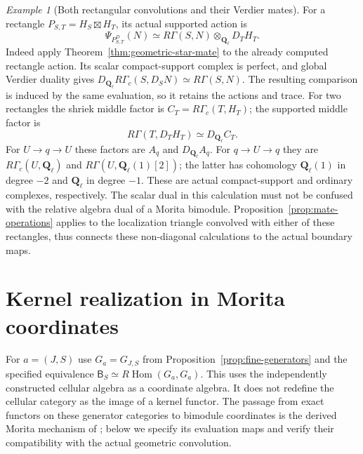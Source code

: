 \documentclass[11pt]{article}
\theoremstyle{definition}
\theoremstyle{remark}
\newtheorem{example}[proposition]{Example}
\newcommand{\Q}{\mathbf Q_\ell}
\newcommand{\RHom}{R\operatorname{Hom}}
\begin{document}
\begin{example}[Both rectangular convolutions and their Verdier mates]
\label{ex:rectangles-with-duals}
For a rectangle $P_{S,T}=H_S\boxtimes H_T$, its actual supported action is
\[
 \Psi_{P_{S,T}^D}(N)\simeq R\Gamma(S,N)\otimes_{\Q}D_TH_T.
\]
Indeed apply Theorem~\ref{thm:geometric-star-mate} to the already
computed rectangle action.  Its scalar compact-support complex is
perfect, and global Verdier duality gives
$D_{\Q}R\Gamma_c(S,D_SN)\simeq R\Gamma(S,N)$.
The resulting comparison is induced by the same evaluation, so it
retains the actions and trace.
For two rectangles the shriek middle factor is
$C_T=R\Gamma_c(T,H_T)$; the supported middle factor is
\[
 R\Gamma(T,D_TH_T)\simeq D_{\Q}C_T.
\]
For $U\to q\to U$ these factors are $A_q$ and $D_{\Q}A_q$.
For $q\to U\to q$ they are $R\Gamma_c(U,\Q)$ and
$R\Gamma(U,\Q(1)[2])$; the latter has cohomology $\Q(1)$ in
degree $-2$ and $\Q$ in degree $-1$.
These are actual compact-support and ordinary complexes, respectively.
The scalar dual in this calculation must not be confused with the
relative algebra dual of a Morita bimodule.
Proposition~\ref{prop:mate-operations} applies to the localization
triangle convolved with either of these rectangles, thus connects
these non-diagonal calculations to the actual boundary maps.
\end{example}

\section{Kernel realization in Morita coordinates}
\label{sec:kernel-morita}
For $a=(J,S)$ use $G_a=G_{J,S}$ from
Proposition~\ref{prop:fine-generators} and the specified equivalence
$\mathsf B_S\simeq\RHom(G_a,G_a)$.  This uses the independently
constructed cellular algebra as a coordinate algebra.  It does not
redefine the cellular category as the image of a kernel functor.
The passage from exact functors on these generator categories to
bimodule coordinates is the derived Morita mechanism of
\cite{ToenMorita}; below we specify its evaluation maps and verify
their compatibility with the actual geometric convolution.
\end{document}
